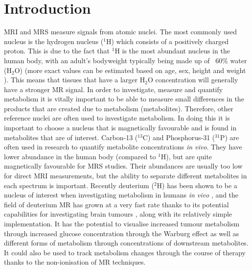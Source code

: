 \chapter{Introduction}
\label{Chap:Introduction}

\Ac{MRI} and \ac{MRS} measure signals from atomic nuclei. The most commonly used nucleus is the hydrogen nucleus ($^1$H) which consists of a positively charged proton. This is due to the fact that $^1$H is the most abundant nucleus in the human body, with an adult's bodyweight typically being made up of ~60\% water (H$_2$O) (more exact values can be estimated based on age, sex, height and weight \cite{Watson1980TotalMeasurements}). This means that tissues that have a larger H$_2$O concentration will generally have a stronger MR signal. In order to investigate, measure and quantify metabolism it is vitally important to be able to measure small differences in the products that are created due to metabolism (metabolites). Therefore, other reference nuclei are often used to investigate metabolism. In doing this it is important to choose a nucleus that is magnetically favourable and is found in metabolites that are of interest. Carbon-13 ($^{13}$C) \cite{Grist2019QuantifyingImaging,Brender2019DynamicHyperpolarization} and Phosphorus-31 ($^{31}$P) \cite{Gordon1980LocalizationResonance} are often used in research to quantify metabolite concentrations \textit{in vivo}. They have lower abundance in the human body (compared to $^1$H), but are quite magnetically favourable for MRS studies. Their abundances are usually too low for direct \ac{MRI} measurements, but the ability to separate different metabolites in each spectrum is important. Recently deuterium ($^2$H) has been shown to be a nucleus of interest when investigating metabolism in humans \textit{in vivo} \cite{Lu2017QuantitativeSpectroscopy,DeFeyter2018DeuteriumVivo}, and the field of deuterium MR has grown at a very fast rate thanks to its potential capabilities for investigating brain tumours \cite{DeFeyter2018DeuteriumVivo}, along with its relatively simple implementation. It has the potential to visualise increased tumour metabolism through increased glucose concentration through the Warburg effect \cite{Warburg1956OnCells} as well as different forms of metabolism through concentrations of downstream metabolites. It could also be used to track metabolism changes through the course of therapy thanks to the non-ionisation of MR techniques.

